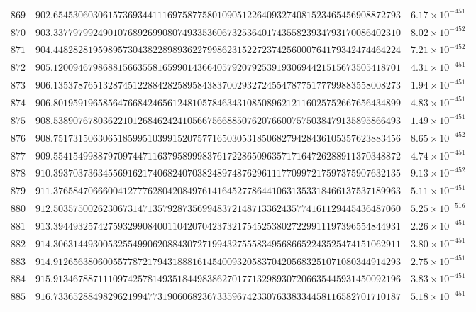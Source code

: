 \documentclass[12pt,reqno]{amsart}
\theoremstyle{remark}
\begin{document}
\begin{longtable}{clc}
$869$ & $902.6545306030615736934411169758775801090512264093274081523465456908872793$ & $6.17\times 10^{-451}$ \\
$870$ & $903.3377979924901076892699080749335360673253640174355823934793170086402310$ & $8.02\times 10^{-452}$ \\
$871$ & $904.4482828195989573043822898936227998623152272374256000764179342474464224$ & $7.21\times 10^{-452}$ \\
$872$ & $905.1200946798688156635581659901436640579207925391930694421515673505418701$ & $4.31\times 10^{-451}$ \\
$873$ & $906.1353787651328745122884282589584383700293272455478775177799883558008273$ & $1.94\times 10^{-451}$ \\
$874$ & $906.8019591965856476684246561248105784634310850896212116025752667656434899$ & $4.83\times 10^{-451}$ \\
$875$ & $908.5389076780362210126846242410566756688507620766007575038479135895866493$ & $1.49\times 10^{-451}$ \\
$876$ & $908.7517315063065185995103991520757716503053185068279428436105357623883456$ & $8.65\times 10^{-452}$ \\
$877$ & $909.5541549988797097447116379589998376172286509635717164726288911370348872$ & $4.74\times 10^{-451}$ \\
$878$ & $910.3937037363455691621740682407038248974876296111770997217597375907632135$ & $9.13\times 10^{-452}$ \\
$879$ & $911.3765847066600412777628042084976141645277864410631353318466137537189963$ & $5.11\times 10^{-451}$ \\
$880$ & $912.5035750026230673147135792873569948372148713362435774161129445436487060$ & $5.25\times 10^{-516}$ \\
$881$ & $913.3944932574275932990840011042070423732175452538027229911197396554844931$ & $2.26\times 10^{-451}$ \\
$882$ & $914.3063144930053255499062088430727199432755583495686652243525474151062911$ & $3.80\times 10^{-451}$ \\
$883$ & $914.9126563806005577872179431888161454009320583704205683251071080344914293$ & $2.75\times 10^{-451}$ \\
$884$ & $915.9134678871110974257814935184498386270177132989307206635445931450092196$ & $3.83\times 10^{-451}$ \\
$885$ & $916.7336528849829621994773190606823673359674233076338334458116582701710187$ & $5.18\times 10^{-451}$ \\

\end{longtable}
\end{document}
